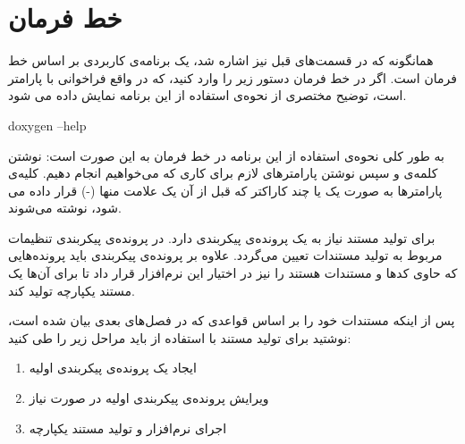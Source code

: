 %
% 
% 
% 
%
\section{خط فرمان}

 همانگونه که در قسمت‌های قبل نیز اشاره شد،  یک برنامه‌ی کاربردی بر
اساس خط فرمان است. اگر در خط فرمان دستور زیر را وارد کنید، که در واقع فراخوانی
 با پارامتر  است، توضیح مختصری از نحوه‌ی استفاده از این
برنامه نمایش داده می شود.

\begin{Shell} 
doxygen --help
\end{Shell}

به طور کلی نحوه‌ی استفاده از این برنامه در خط فرمان به این صورت است: نوشتن
کلمه‌ی  و سپس نوشتن پارامترهای لازم برای کاری که می‌خواهیم انجام
دهیم. کلیه‌ی پارامترها به صورت یک یا چند کاراکتر که قبل از آن یک علامت منها (-)
قرار داده می شود، نوشته می‌شوند.

برای تولید مستند نیاز به یک پرونده‌ی پیکربندی دارد. در پرونده‌ی پیکربندی تنظیمات
مربوط به تولید مستندات تعیین می‌گردد. علاوه بر پرونده‌ی پیکربندی باید
پرونده‌هایی که حاوی کدها و مستندات هستند را نیز در اختیار این نرم‌افزار قرار داد
تا برای آن‌ها یک مستند یکپارچه تولید کند.

پس از اینکه مستندات خود را بر اساس قواعدی که در فصل‌های بعدی بیان شده است، 
نوشتید برای تولید مستند با استفاده از  باید مراحل زیر را طی کنید:
\begin{enumerate}
\item ایجاد یک پرونده‌ی پیکربندی اولیه
\item ویرایش پرونده‌ی پیکربندی اولیه در صورت نیاز
\item اجرای نرم‌افزار  و تولید مستند یکپارچه
\end{enumerate}

